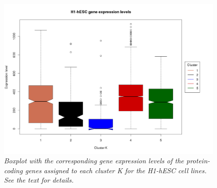 \begin{figure}[!ht]
\begin{center}
 \includegraphics[scale = 0.39]{images/h1MethProfBoxPlot}
\caption{\emph{Boxplot with the corresponding gene expression levels of the protein-coding genes assigned to each cluster K for the H1-hESC cell lines. See the text for details.}}
\label{h1MethProfBoxPlot-pic}
\end{center}
\end{figure}